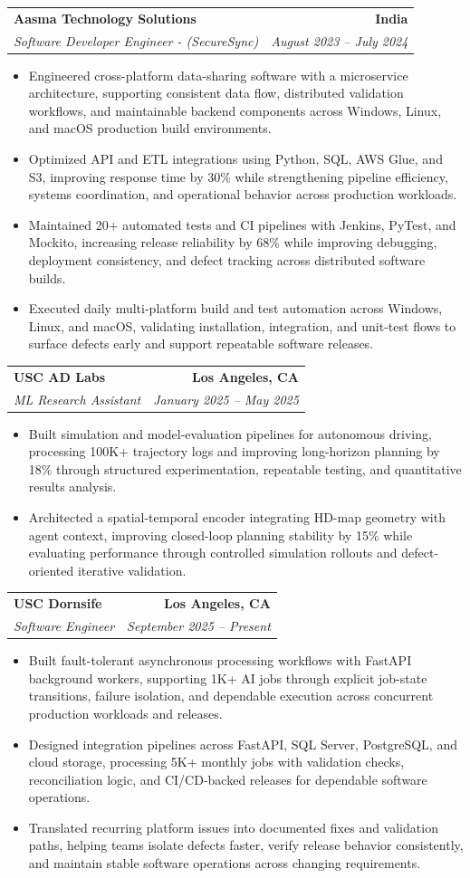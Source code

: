 \documentclass[letterpaper,10pt]{article}
\makeatletter
\newcommand{\resumeItem}[1]{\item\small{{#1 \vspace{-2pt}}}}
\newcommand{\resumeSubheading}[4]{\vspace{-1pt}\item\begin{tabular*}{1.0\textwidth}[t]{l@{\extracolsep{\fill}}r}\textbf{#1} & \textbf{\small #2} \\\textit{\small#3} & \textit{\small #4} \\\end{tabular*}\vspace{-2pt}}
\newcommand{\resumeItemListStart}{\begin{itemize}[leftmargin=0.15in,label=\textbullet,itemsep=2pt,topsep=0pt,parsep=0pt,partopsep=0pt]}
\newcommand{\resumeItemListEnd}{\end{itemize}\vspace{-4pt}}
\makeatother
\begin{document}
\resumeSubheading{Aasma Technology Solutions}{India}{Software Developer Engineer - (SecureSync)}{August 2023 -- July 2024}
\resumeItemListStart
\resumeItem{Engineered cross-platform data-sharing software with a microservice architecture, supporting consistent data flow, distributed validation workflows, and maintainable backend components across Windows, Linux, and macOS production build environments.}
\resumeItem{Optimized API and ETL integrations using Python, SQL, AWS Glue, and S3, improving response time by 30\% while strengthening pipeline efficiency, systems coordination, and operational behavior across production workloads.}
\resumeItem{Maintained 20+ automated tests and CI pipelines with Jenkins, PyTest, and Mockito, increasing release reliability by 68\% while improving debugging, deployment consistency, and defect tracking across distributed software builds.}
\resumeItem{Executed daily multi-platform build and test automation across Windows, Linux, and macOS, validating installation, integration, and unit-test flows to surface defects early and support repeatable software releases.}
\resumeItemListEnd

\resumeSubheading{USC AD Labs}{Los Angeles, CA}{ML Research Assistant}{January 2025 -- May 2025}
\resumeItemListStart
\resumeItem{Built simulation and model-evaluation pipelines for autonomous driving, processing 100K+ trajectory logs and improving long-horizon planning by 18\% through structured experimentation, repeatable testing, and quantitative results analysis.}
\resumeItem{Architected a spatial-temporal encoder integrating HD-map geometry with agent context, improving closed-loop planning stability by 15\% while evaluating performance through controlled simulation rollouts and defect-oriented iterative validation.}
\resumeItemListEnd

\resumeSubheading{USC Dornsife}{Los Angeles, CA}{Software Engineer}{September 2025 -- Present}
\resumeItemListStart
\resumeItem{Built fault-tolerant asynchronous processing workflows with FastAPI background workers, supporting 1K+ AI jobs through explicit job-state transitions, failure isolation, and dependable execution across concurrent production workloads and releases.}
\resumeItem{Designed integration pipelines across FastAPI, SQL Server, PostgreSQL, and cloud storage, processing 5K+ monthly jobs with validation checks, reconciliation logic, and CI/CD-backed releases for dependable software operations.}
\resumeItem{Translated recurring platform issues into documented fixes and validation paths, helping teams isolate defects faster, verify release behavior consistently, and maintain stable software operations across changing requirements.}
\resumeItemListEnd
\end{document}

